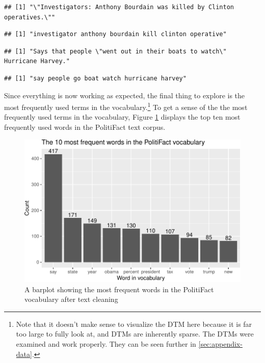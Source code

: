 \documentclass[12pt]{article}
\begin{document}
\begin{verbatim}
## [1] "\"Investigators: Anthony Bourdain was killed by Clinton operatives.\""
\end{verbatim}

\begin{verbatim}
## [1] "investigator anthony bourdain kill clinton operative"
\end{verbatim}

\begin{verbatim}
## [1] "Says that people \"went out in their boats to watch\" Hurricane Harvey."
\end{verbatim}

\begin{verbatim}
## [1] "say people go boat watch hurricane harvey"
\end{verbatim}

Since everything is now working as expected, the final thing to explore
is the most frequently used terms in the vocabulary.\footnote{Note that
  it doesn't make sense to visualize the DTM here because it is far too
  large to fully look at, and DTMs are inherently sparse. The DTMs were
  examined and work properly. They can be seen further in
  \ref{sec:appendix-data}.} To get a sense of the the most frequently
used terms in the vocabulary, Figure \ref{fig:word-freq} displays the
top ten most frequently used words in the PolitiFact text corpus.

\begin{figure}[H]
\includegraphics{report_files/figure-latex/word-freq-1} \caption{\label{fig:word-freq}A barplot showing the most frequent words in the PolitiFact vocabulary after text cleaning}\label{fig:word-freq}
\end{figure}
\end{document}
